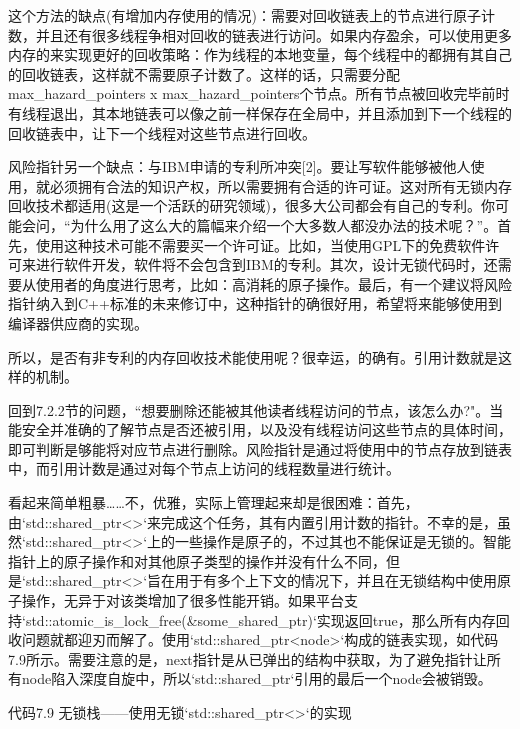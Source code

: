 这个方法的缺点(有增加内存使用的情况)：需要对回收链表上的节点进行原子计数，并且还有很多线程争相对回收的链表进行访问。如果内存盈余，可以使用更多内存的来实现更好的回收策略：作为线程的本地变量，每个线程中的都拥有其自己的回收链表，这样就不需要原子计数了。这样的话，只需要分配max\_hazard\_pointers x max\_hazard\_pointers个节点。所有节点被回收完毕前时有线程退出，其本地链表可以像之前一样保存在全局中，并且添加到下一个线程的回收链表中，让下一个线程对这些节点进行回收。

风险指针另一个缺点：与IBM申请的专利所冲突[2]。要让写软件能够被他人使用，就必须拥有合法的知识产权，所以需要拥有合适的许可证。这对所有无锁内存回收技术都适用(这是一个活跃的研究领域)，很多大公司都会有自己的专利。你可能会问，“为什么用了这么大的篇幅来介绍一个大多数人都没办法的技术呢？”。首先，使用这种技术可能不需要买一个许可证。比如，当使用GPL下的免费软件许可来进行软件开发，软件将不会包含到IBM的专利。其次，设计无锁代码时，还需要从使用者的角度进行思考，比如：高消耗的原子操作。最后，有一个建议将风险指针纳入到C++标准的未来修订中，这种指针的确很好用，希望将来能够使用到编译器供应商的实现。

所以，是否有非专利的内存回收技术能使用呢？很幸运，的确有。引用计数就是这样的机制。


回到7.2.2节的问题，“想要删除还能被其他读者线程访问的节点，该怎么办?"。当能安全并准确的了解节点是否还被引用，以及没有线程访问这些节点的具体时间，即可判断是够能将对应节点进行删除。风险指针是通过将使用中的节点存放到链表中，而引用计数是通过对每个节点上访问的线程数量进行统计。

看起来简单粗暴……不，优雅，实际上管理起来却是很困难：首先，由`std::shared\_ptr<>`来完成这个任务，其有内置引用计数的指针。不幸的是，虽然`std::shared\_ptr<>`上的一些操作是原子的，不过其也不能保证是无锁的。智能指针上的原子操作和对其他原子类型的操作并没有什么不同，但是`std::shared\_ptr<>`旨在用于有多个上下文的情况下，并且在无锁结构中使用原子操作，无异于对该类增加了很多性能开销。如果平台支持`std::atomic\_is\_lock\_free(&some\_shared\_ptr)`实现返回true，那么所有内存回收问题就都迎刃而解了。使用`std::shared\_ptr<node>`构成的链表实现，如代码7.9所示。需要注意的是，next指针是从已弹出的结构中获取，为了避免指针让所有node陷入深度自旋中，所以`std::shared\_ptr`引用的最后一个node会被销毁。

代码7.9 无锁栈——使用无锁`std::shared\_ptr<>`的实现

